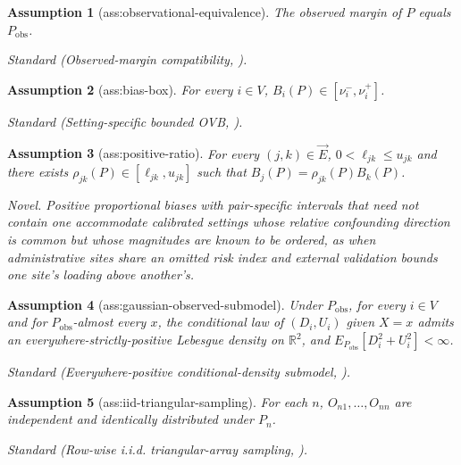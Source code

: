 \documentclass{article}
\newtheorem{assumption}{Assumption}
\begin{document}
\begin{assumption}[ass:observational-equivalence]\label{ass:observational-equivalence}
The observed margin of \(P\) equals \(P_{\mathrm{obs}}\).
\par\smallskip\noindent\emph{Standard} (Observed-margin compatibility, \cite{BalkePearl1997}).
\end{assumption}

\begin{assumption}[ass:bias-box]\label{ass:bias-box}
For every \(i\in V\), \(B_i(P)\in[\nu^-_i,\nu^+_i]\).
\par\smallskip\noindent\emph{Standard} (Setting-specific bounded OVB, \cite{HuntingtonKlein2026}).
\end{assumption}

\begin{assumption}[ass:positive-ratio]\label{ass:positive-ratio}
For every \((j,k)\in\vec E\), \(0<\ell_{jk}\le u_{jk}\) and there exists \(\rho_{jk}(P)\in[\ell_{jk},u_{jk}]\) such that \(B_j(P)=\rho_{jk}(P)B_k(P)\).
\par\smallskip\noindent\emph{Novel.} Positive proportional biases with pair-specific intervals that need not contain one accommodate calibrated settings whose relative confounding direction is common but whose magnitudes are known to be ordered, as when administrative sites share an omitted risk index and external validation bounds one site's loading above another's.
\end{assumption}

\begin{assumption}[ass:gaussian-observed-submodel]\label{ass:gaussian-observed-submodel}
Under \(P_{\mathrm{obs}}\), for every \(i\in V\) and for \(P_{\mathrm{obs}}\)-almost every \(x\), the conditional law of \((D_i,U_i)\) given \(X=x\) admits an everywhere-strictly-positive Lebesgue density on \(\mathbb R^2\), and \(E_{P_{\mathrm{obs}}}[D_i^2+U_i^2]<\infty\).
\par\smallskip\noindent\emph{Standard} (Everywhere-positive conditional-density submodel, \cite{Wooldridge2010}).
\end{assumption}

\begin{assumption}[ass:iid-triangular-sampling]\label{ass:iid-triangular-sampling}
For each \(n\), \(O_{n1},\ldots,O_{nn}\) are independent and identically distributed under \(P_n\).
\par\smallskip\noindent\emph{Standard} (Row-wise i.i.d. triangular-array sampling, \cite{KaidoMolinariStoye2019}).
\end{assumption}
\end{document}
